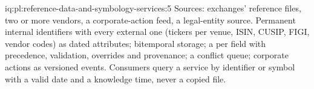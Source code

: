\begin{solution}{iq:pl:reference-data-and-symbology-services:5}
Sources: exchanges' reference files, two or more vendors, a corporate-action feed, a legal-entity source. Permanent internal
identifiers with every external one (tickers per venue, ISIN, CUSIP, FIGI, vendor codes) as dated attributes; bitemporal storage;
a  per field with precedence, validation, overrides and provenance; a conflict queue; corporate actions as versioned
events. Consumers query a service by identifier or symbol with a valid date and a knowledge time, never a copied file.
\end{solution}
